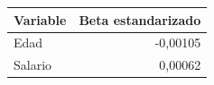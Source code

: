 \begin{tabular}{lr}
\toprule
Variable & Beta estandarizado \\
\midrule
Edad & -0,00105 \\
Salario & 0,00062 \\
\bottomrule
\end{tabular}
